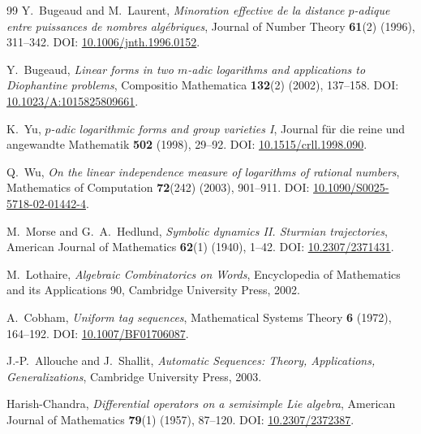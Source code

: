 \documentclass[11pt,oneside]{article}
\theoremstyle{definition}
\theoremstyle{remark}
\begin{document}
\begin{thebibliography}{99}
Y.~Bugeaud and M.~Laurent,
\newblock \emph{Minoration effective de la distance $p$-adique entre puissances de nombres alg\'ebriques},
\newblock Journal of Number Theory \textbf{61}(2) (1996), 311--342.
\newblock DOI: \href{https://doi.org/10.1006/jnth.1996.0152}{10.1006/jnth.1996.0152}.

Y.~Bugeaud,
\newblock \emph{Linear forms in two $m$-adic logarithms and applications to Diophantine problems},
\newblock Compositio Mathematica \textbf{132}(2) (2002), 137--158.
\newblock DOI: \href{https://doi.org/10.1023/A:1015825809661}{10.1023/A:1015825809661}.

K.~Yu,
\newblock \emph{$p$-adic logarithmic forms and group varieties I},
\newblock Journal f\"ur die reine und angewandte Mathematik \textbf{502} (1998), 29--92.
\newblock DOI: \href{https://doi.org/10.1515/crll.1998.090}{10.1515/crll.1998.090}.

Q.~Wu,
\newblock \emph{On the linear independence measure of logarithms of rational numbers},
\newblock Mathematics of Computation \textbf{72}(242) (2003), 901--911.
\newblock DOI: \href{https://doi.org/10.1090/S0025-5718-02-01442-4}{10.1090/S0025-5718-02-01442-4}.

M.~Morse and G.~A.~Hedlund,
\newblock \emph{Symbolic dynamics II. Sturmian trajectories},
\newblock American Journal of Mathematics \textbf{62}(1) (1940), 1--42.
\newblock DOI: \href{https://doi.org/10.2307/2371431}{10.2307/2371431}.

M.~Lothaire,
\newblock \emph{Algebraic Combinatorics on Words},
\newblock Encyclopedia of Mathematics and its Applications 90, Cambridge University Press, 2002.

A.~Cobham,
\newblock \emph{Uniform tag sequences},
\newblock Mathematical Systems Theory \textbf{6} (1972), 164--192.
\newblock DOI: \href{https://doi.org/10.1007/BF01706087}{10.1007/BF01706087}.

J.-P.~Allouche and J.~Shallit,
\newblock \emph{Automatic Sequences: Theory, Applications, Generalizations},
\newblock Cambridge University Press, 2003.

Harish-Chandra,
\newblock \emph{Differential operators on a semisimple Lie algebra},
\newblock American Journal of Mathematics \textbf{79}(1) (1957), 87--120.
\newblock DOI: \href{https://doi.org/10.2307/2372387}{10.2307/2372387}.


\end{thebibliography}
\end{document}
